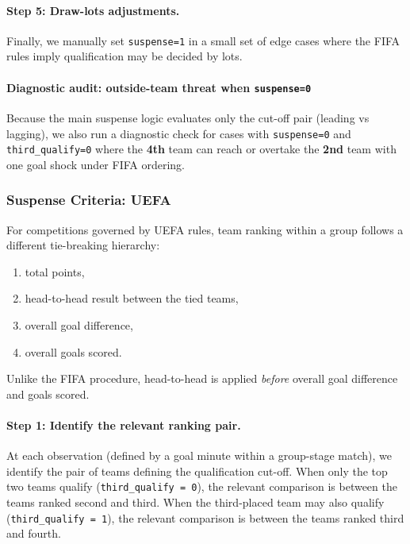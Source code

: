 \documentclass[11pt]{article}
\begin{document}
\paragraph{Step 5: Draw-lots adjustments.}

Finally, we manually set \texttt{suspense=1} in a small set of edge cases where the FIFA rules imply qualification may be decided by lots.

\paragraph{Diagnostic audit: outside-team threat when \texttt{suspense=0}}
Because the main suspense logic evaluates only the cut-off pair (leading vs lagging), we also run a diagnostic check for cases with \texttt{suspense=0} and \texttt{third\_qualify=0} where the \textbf{4th} team can reach or overtake the \textbf{2nd} team with one goal shock under FIFA ordering.


\subsubsection*{Suspense Criteria: UEFA}
\label{sec:suspense-uefa-implemented}

For competitions governed by UEFA rules, team ranking within a group follows a different tie-breaking hierarchy:
\begin{enumerate}
    \item total points,
    \item head-to-head result between the tied teams,
    \item overall goal difference,
    \item overall goals scored.
\end{enumerate}
Unlike the FIFA procedure, head-to-head is applied \emph{before} overall goal difference and goals scored.

\paragraph{Step 1: Identify the relevant ranking pair.}
At each observation (defined by a goal minute within a group-stage match), we identify the pair of teams defining the qualification cut-off. When only the top two teams qualify (\texttt{third\_qualify = 0}), the relevant comparison is between the teams ranked second and third. When the third-placed team may also qualify (\texttt{third\_qualify = 1}), the relevant comparison is between the teams ranked third and fourth.
\end{document}
